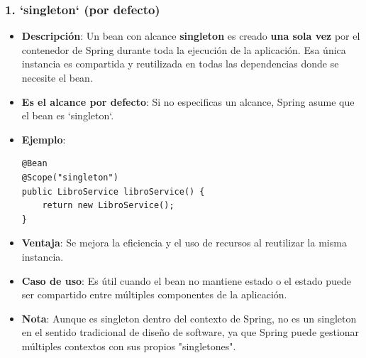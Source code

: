 \documentclass[11pt]{article}
\begin{document}
\subsubsection{1. \textbf{\textbf{`singleton`}} (por defecto)}
\label{sec:org123ff90}
\begin{itemize}
\item \textbf{\textbf{Descripción}}: Un bean con alcance \textbf{\textbf{singleton}} es creado \textbf{\textbf{una sola vez}} por el contenedor de Spring durante toda la ejecución de la aplicación. Esa única instancia es compartida y reutilizada en todas las dependencias donde se necesite el bean.
\item \textbf{\textbf{Es el alcance por defecto}}: Si no especificas un alcance, Spring asume que el bean es `singleton`.

\item \textbf{\textbf{Ejemplo}}:
\begin{verbatim}
@Bean
@Scope("singleton")
public LibroService libroService() {
    return new LibroService();
}
\end{verbatim}

\item \textbf{\textbf{Ventaja}}: Se mejora la eficiencia y el uso de recursos al reutilizar la misma instancia.
\item \textbf{\textbf{Caso de uso}}: Es útil cuando el bean no mantiene estado o el estado puede ser compartido entre múltiples componentes de la aplicación.
\item \textbf{\textbf{Nota}}: Aunque es singleton dentro del contexto de Spring, no es un singleton en el sentido tradicional de diseño de software, ya que Spring puede gestionar múltiples contextos con sus propios "singletones".
\end{itemize}
\end{document}
